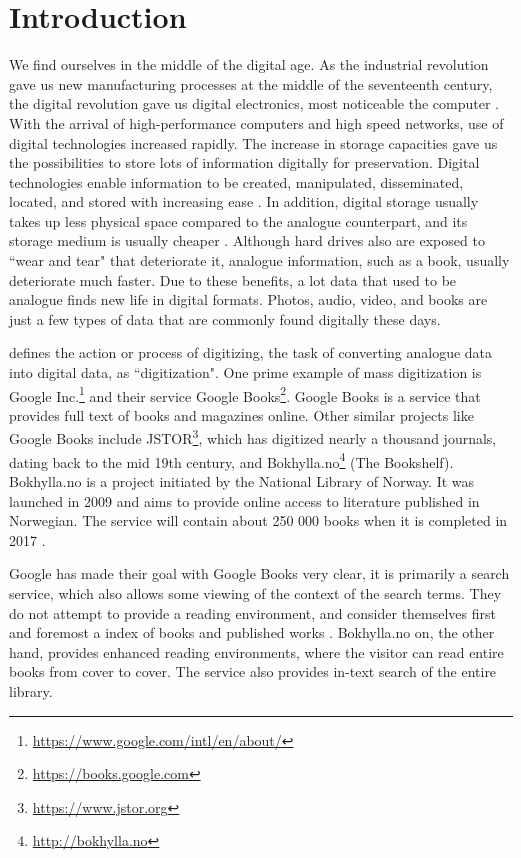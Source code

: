 
\chapter{Introduction}
\label{ch:introduction}
We find ourselves in the middle of the digital age. As the industrial revolution gave us new manufacturing processes at the middle of the seventeenth century, the digital revolution gave us digital electronics, most noticeable the computer \citep{freeman2001time}. With the arrival of high-performance computers and high speed networks, use of digital technologies increased rapidly. The increase in storage capacities gave us the possibilities to store lots of information digitally for preservation. Digital technologies enable information to be created, manipulated, disseminated, located, and stored with increasing ease \citep{lee2002state}. In addition, digital storage usually takes up less physical space compared to the analogue counterpart, and its storage medium is usually cheaper \citep{morris2003evolution}. Although hard drives also are exposed to ``wear and tear" that deteriorate it, analogue information, such as a book, usually deteriorate much faster. Due to these benefits, a lot data that used to be analogue finds new life in digital formats. Photos, audio, video, and books are just a few types of data that are commonly found digitally these days.

\citep{misc-oed-digitization} defines the action or process of digitizing, the task of converting analogue data into digital data, as ``digitization". One prime example of mass digitization is Google Inc.\footnote{\url{https://www.google.com/intl/en/about/}} and their service Google Books\footnote{\url{https://books.google.com}}. Google Books is a service that provides full text of books and magazines online. Other similar projects like Google Books include JSTOR\footnote{\url{https://www.jstor.org}}, which has digitized nearly a thousand journals, dating back to the mid 19th century, and Bokhylla.no\footnote{\url{http://bokhylla.no}} (The Bookshelf). Bokhylla.no is a project initiated by the National Library of Norway. It was launched in 2009 and aims to provide online access to literature published in Norwegian. The service will contain about 250 000 books when it is completed in 2017 \citep{misc-nb-digial-library}.

Google has made their goal with Google Books very clear, it is primarily a search service, which also allows some viewing of the context of the search terms. They do not attempt to provide a reading environment, and consider themselves first and foremost a index of books and published works \citep{coyle2006mass}. Bokhylla.no on, the other hand, provides enhanced reading environments, where the visitor can read entire books from cover to cover. The service also provides in-text search of the entire library. 

